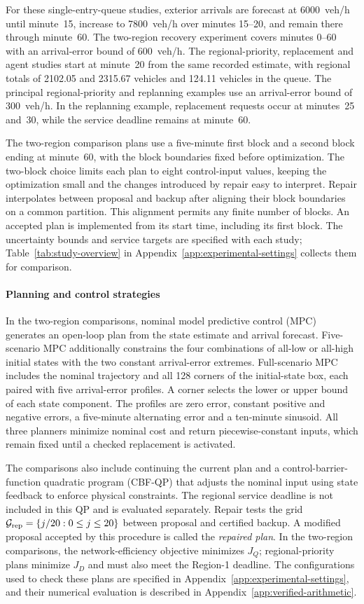 \documentclass[final]{cas-sc}
\theoremstyle{definition}
\theoremstyle{plain}
\theoremstyle{definition}
\theoremstyle{plain}
\newcommand{\appref}[1]{Appendix~\ref{#1}}
\begin{document}
For these single-entry-queue studies, exterior arrivals are forecast
at 6000~veh/h until minute~15, increase to 7800~veh/h over minutes
15--20, and remain there through minute~60. The two-region recovery
experiment covers minutes
0--60 with an arrival-error bound of 600~veh/h. The regional-priority,
replacement and agent studies start at minute~20 from the same recorded
estimate, with regional totals of 2102.05 and 2315.67 vehicles and
124.11 vehicles in the queue. The principal regional-priority and
replanning examples use an arrival-error bound of 300~veh/h.
In the replanning example, replacement requests occur at minutes~25
and~30, while the service deadline remains at minute~60.

The two-region comparison plans use a five-minute first block and a
second block ending at minute~60, with the block boundaries fixed before optimization. The
two-block choice limits each plan to eight control-input values,
keeping the optimization small and the changes introduced by repair
easy to interpret. Repair interpolates between proposal and backup
after aligning their block boundaries on a common partition. This
alignment permits any finite number of blocks. An accepted plan is
implemented from its start time, including its first block.
The uncertainty bounds and service targets are specified with each
study; Table~\ref{tab:study-overview} in
\appref{app:experimental-settings} collects them for comparison.

\paragraph{Planning and control strategies}
In the two-region comparisons, nominal model predictive control
(MPC) generates an open-loop plan from
the state estimate and arrival forecast. Five-scenario MPC additionally
constrains the four combinations of all-low or all-high initial states
with the two constant arrival-error extremes. Full-scenario MPC includes the nominal trajectory and
all 128 corners of the initial-state box, each paired with five
arrival-error profiles. A corner selects the lower or upper bound of
each state component. The profiles are zero error, constant positive
and negative errors, a five-minute alternating error and a ten-minute
sinusoid. All three planners minimize nominal cost and return
piecewise-constant inputs, which remain fixed until a checked replacement
is activated.

The comparisons also include continuing the current plan and a
control-barrier-function quadratic program (CBF-QP) that adjusts the
nominal input using state feedback to enforce physical constraints.
The regional service deadline is not included in this QP and is evaluated
separately. Repair tests the grid $\mathcal G_{\rm rep}=\{j/20:0\le j\le20\}$
between proposal and certified backup. A modified proposal accepted by
this procedure is called the \emph{repaired plan}. In the two-region comparisons, the network-efficiency objective
minimizes $J_Q$; regional-priority plans minimize $J_D$ and must also
meet the Region-1 deadline. The configurations used to check these plans
are specified in \appref{app:experimental-settings}, and their numerical
evaluation is described in \appref{app:verified-arithmetic}.
\end{document}
